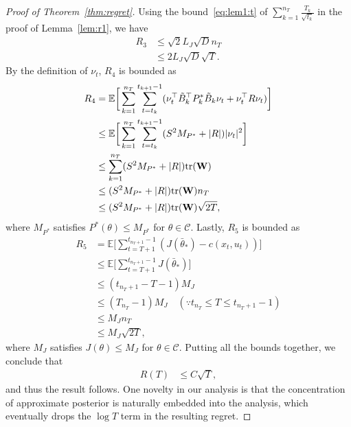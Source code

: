 \documentclass[11pt]{article}
\theoremstyle{plain}
\theoremstyle{definition}
\theoremstyle{remark}
\begin{document}
\begin{proof}[Proof of Theorem~\ref{thm:regret}]
Using the bound~\eqref{eq:lem1:t} of $\sum_{k=1}^{n_T} \frac{T_k}{\sqrt{t_k}}$ in the proof of Lemma~\ref{lem:r1}, we have
\begin{equation}\nonumber
\begin{split}
R_3 &\leq \sqrt{2}  L_J \sqrt{D} n_T\\
&\leq 2  L_J \sqrt{D} \sqrt{T}.
\end{split}
\end{equation}
By the definition of $\nu_t$, $R_4$ is bounded as
\begin{equation}\nonumber
\begin{split}
R_4 &=\mathbb{E}\bigg[\sum_{k=1}^{n_T} \sum_{t=t_k}^{t_{k+1} - 1}(\nu_t^{\top} \Tilde{B}_k^{\top}P^*_k\Tilde{B}_k\nu_t +\nu_t^{\top} R \nu_t)\bigg]\\
&\leq \mathbb{E}\bigg[\sum_{k=1}^{n_T}\sum_{t=t_k}^{t_{k+1} - 1}(S^2M_{P^*}+|R|)|\nu_t|^2\bigg]\\
&\leq \sum_{k=1}^{n_T}(S^2M_{P^*}+|R|)\mathrm{tr}(\mathbf{W})\\
&\leq (S^2M_{P^*}+|R|)\mathrm{tr}(\mathbf{W})n_T\\
&\leq (S^2M_{P^*}+|R|)\mathrm{tr}(\mathbf{W})\sqrt{2T},
\end{split}    
\end{equation}
where $M_{P^*}$ satisfies $P^*(\theta)\leq M_{P^*}$ for $\theta\in\mathcal{C}$. 
Lastly, $R_5$ is bounded as
\begin{equation}\nonumber
\begin{split}
R_5 &= \mathbb{E} \bigg [ \sum_{t=T+1}^{t_{n_T+1} - 1} (  J (\bar{\theta}_*) - c (x_t, u_t))  \bigg ]\\
&\leq \mathbb{E} \bigg [ \sum_{t=T+1}^{t_{n_T+1} - 1}  J (\bar{\theta}_*) \bigg ]\\
&\leq (t_{n_T+1} - T-1 )M_J\\
&\leq (T_{n_T}-1) M_J \quad (\because t_{n_T} \leq T \leq t_{n_T +1} - 1)\\
&\leq M_J n_T \\
&\leq M_J \sqrt{2T},
\end{split}
\end{equation}
where $M_J$ satisfies $J(\theta)\leq M_J$ for $\theta \in \mathcal{C}$.
Putting all the bounds together, we conclude that
\begin{equation}\nonumber
\begin{split}
R(T) &\leq C \sqrt{T}, 
 \end{split}
\end{equation}
and thus the result follows. One novelty in our analysis is that the concentration of approximate posterior is naturally embedded into the analysis, which eventually drops the $\log T$ term in the resulting regret.
\end{proof}
\end{document}
